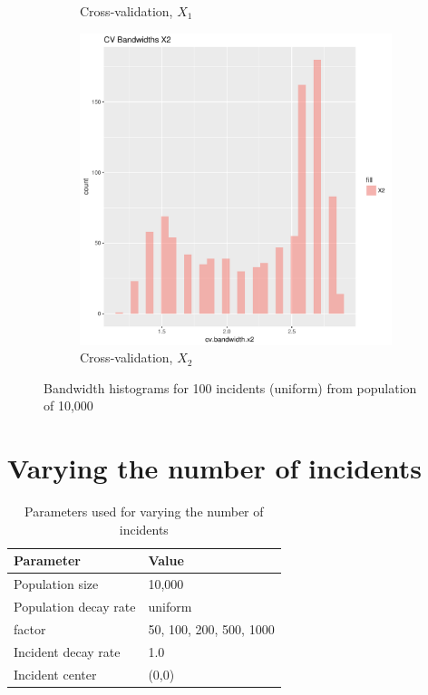 \begin{figure}[htbp]
\begin{subfigure}[b]{0.3\textwidth}
    \caption{Cross-validation, \(X_1\)}
    \label{fig:bandwidths_x1:unif_100_unif:x1}
    \end{subfigure}
    \begin{subfigure}[b]{0.3\textwidth}
    \includegraphics[width=\textwidth]{results/unif_100_unif/output/bandwidths-x2}
    \caption{Cross-validation, \(X_2\)}
    \label{fig:bandwidths_x1:unif_100_unif:x2}
    \end{subfigure}
    \caption{Bandwidth histograms for 100 incidents (uniform) from population of 10,000}
\end{figure}


\section{Varying the number of incidents}
\label{sec:results:unif_NCases_1h}

\begin{table}[htbp]
\centering
\begin{tabular}{ll}
\hline
Parameter & Value \\
\hline
Population size & 10,000 \\
Population decay rate & uniform \\
\Gls{factor} & 50, 100, 200, 500, 1000 \\
Incident decay rate & 1.0 \\
Incident center & (0,0) \\
\hline
\end{tabular}
\caption{Parameters used for varying the number of incidents}
\label{tab:params:unif_NCases_1h}
\end{table}

